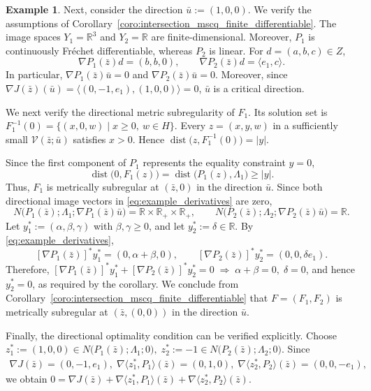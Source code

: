 \documentclass[12pt,twoside,reqno]{amsart}
\theoremstyle{definition}
\newtheorem{example}[theorem]{Example}
\numberwithin{equation}{section}
\begin{document}
\begin{example}
Next, consider the direction \(\bar{u}:=(1,0,0)\). We verify the
assumptions of
Corollary~\ref{coro:intersection_mscq_finite_differentiable}. The image
spaces \(Y_1=\mathbb R^3\) and \(Y_2=\mathbb R\) are
finite-dimensional. Moreover, \(P_1\) is continuously Fr\'echet
differentiable, whereas \(P_2\) is linear. For
\(d=(a,b,c)\in Z\),
\begin{equation}\label{eq:example_derivatives}
    \nabla P_1(\bar{z})d=(b,b,0),
    \qquad
    \nabla P_2(\bar{z})d=\langle e_1,c\rangle.
\end{equation}
In particular,
\(\nabla P_1(\bar{z})\bar{u}=0\) and
\(\nabla P_2(\bar{z})\bar{u}=0\). Moreover, since
\(\nabla J(\bar{z})(\bar{u})=\langle(0,-1,e_1),(1,0,0)\rangle=0\),
\(\bar{u}\) is a critical direction.

We next verify the directional metric subregularity of \(F_1\). Its
solution set is $F_1^{-1}(0)=\{(x,0,w)\mid x\geq0,\ w\in H\}$. 
Every \(z=(x,y,w)\) in a sufficiently small $\mathcal{V}(\bar{z};\bar{u})$ satisfies \(x>0\). Hence $\operatorname{dist}\bigl(z,F_1^{-1}(0)\bigr)=|y|$. 

Since the first component of \(P_1\) represents the equality
constraint \(y=0\),
\[
    \operatorname{dist}\bigl(0,F_1(z)\bigr)
    =\operatorname{dist}\bigl(P_1(z),\Lambda_1\bigr)
    \geq |y|.
\]
Thus, \(F_1\) is metrically subregular at \((\bar{z},0)\) in the
direction \(\bar{u}\). Since
both directional image vectors in \eqref{eq:example_derivatives} are
zero,
\[
    N\bigl(P_1(\bar{z});\Lambda_1;\nabla P_1(\bar{z})\bar{u}\bigr)
       =\mathbb R\times\mathbb R_+\times\mathbb R_+,
    \qquad
    N\bigl(P_2(\bar{z});\Lambda_2;\nabla P_2(\bar{z})\bar{u}\bigr)
       =\mathbb R.
\]
Let \(y_1^*:=(\alpha,\beta,\gamma)\) with
\(\beta,\gamma\geq0\), and let \(y_2^*:=\delta\in\mathbb R\). By
\eqref{eq:example_derivatives},
\[
    [\nabla P_1(\bar{z})]^*y_1^*
       =(0,\alpha+\beta,0),
    \qquad
    [\nabla P_2(\bar{z})]^*y_2^*
       =(0,0,\delta e_1).
\]
Therefore, $[\nabla P_1(\bar{z})]^*y_1^*
    +[\nabla P_2(\bar{z})]^*y_2^*=0
    \; \Longrightarrow\;
    \alpha+\beta=0,\; \delta=0$, 
and hence \(y_2^*=0\), as required by the corollary. We conclude from
Corollary~\ref{coro:intersection_mscq_finite_differentiable} that
\(F=(F_1,F_2)\) is metrically subregular at
\((\bar{z},(0,0))\) in the direction \(\bar{u}\).

Finally, the directional optimality condition can be verified explicitly. Choose $z_1^*:=(1,0,0)
    \in N\bigl(P_1(\bar{z});\Lambda_1;0\bigr),
    \;
    z_2^*:=-1
    \in N\bigl(P_2(\bar{z});\Lambda_2;0\bigr)$. Since
\[
    \begin{aligned}
        \nabla J(\bar{z})=(0,-1,e_1),\;\nabla\langle z_1^*,P_1\rangle(\bar{z})=(0,1,0),\;
        \nabla\langle z_2^*,P_2\rangle(\bar{z})=(0,0,-e_1),
    \end{aligned}
\]
we obtain $0=\nabla J(\bar{z})
     +\nabla\langle z_1^*,P_1\rangle(\bar{z})
     +\nabla\langle z_2^*,P_2\rangle(\bar{z})$. 
\end{example}
\end{document}
